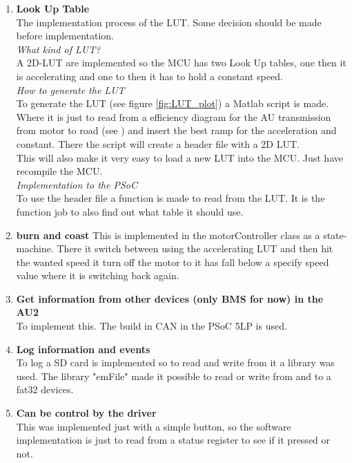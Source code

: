 \begin{enumerate} %
	\item \textbf{Look Up Table}\\
	The implementation process of the LUT. Some decision should be made before implementation.\\
	\subitem \textit{What kind of LUT?}\\
	A 2D-LUT are implemented so the MCU has two Look Up tables, one then it is accelerating and one to then it has to hold a constant speed.\\
	\subitem \textit{How to generate the LUT}\\
	To generate the LUT (see figure \vref{fig:LUT_plot}) a Matlab script\cite{LUTscript} is made. Where it is just to read from a efficiency diagram for the AU transmission from motor to road  (see \cite{BAC_zenith33}) and insert the best ramp for the acceleration and constant. There the script will create a header file with a 2D LUT.\\
	This will also make it very easy to load a new LUT into the MCU. Just have recompile the MCU.\\
	\subitem \textit{Implementation to the PSoC}\\
	To use the header file a function is made to read from the LUT. It is the function job to also find out what table it should use.\\	
	\item \textbf{burn and coast}
	This is implemented in the motorController class as a state-machine. There it switch between using the accelerating LUT and then hit the wanted speed it turn off the motor to it has fall below a specify speed value where it is switching back again. 
	\item \textbf{Get information from other devices (only BMS for now) in the AU2}\\
	To implement this. The build in CAN in the PSoC 5LP is used. 
	\item \textbf{Log information and events}\\
	To log a SD card is implemented so to read and write from it a library was used. The library "emFile" made it possible to read or write from and to a fat32 devices.\\
	\item \textbf{Can be control by the driver}\\
	This was implemented just with a simple button, so the software implementation is just to read from a status register to see if it pressed or not.\\

\end{enumerate}
